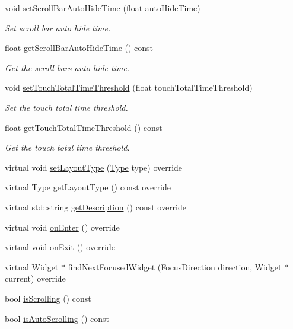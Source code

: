 \begin{DoxyCompactItemize}
void \hyperlink{classui_1_1ScrollView_a388fd5017d29f1686e207348ad040358}{set\+Scroll\+Bar\+Auto\+Hide\+Time} (float auto\+Hide\+Time)
\begin{DoxyCompactList}\small\item\em Set scroll bar auto hide time. \end{DoxyCompactList}\item 
float \hyperlink{classui_1_1ScrollView_a827ccba8ebbcacfe3f8b985b49c606e5}{get\+Scroll\+Bar\+Auto\+Hide\+Time} () const
\begin{DoxyCompactList}\small\item\em Get the scroll bar\textquotesingle{}s auto hide time. \end{DoxyCompactList}\item 
void \hyperlink{classui_1_1ScrollView_a3edbf2bec7e58e40cbde16437d8ee927}{set\+Touch\+Total\+Time\+Threshold} (float touch\+Total\+Time\+Threshold)
\begin{DoxyCompactList}\small\item\em Set the touch total time threshold. \end{DoxyCompactList}\item 
float \hyperlink{classui_1_1ScrollView_ab4d03d2ed9f34c127f7080c900a880d0}{get\+Touch\+Total\+Time\+Threshold} () const
\begin{DoxyCompactList}\small\item\em Get the touch total time threshold. \end{DoxyCompactList}\item 
virtual void \hyperlink{classui_1_1ScrollView_a4056a0a2c5653b6e00fa983740f621d9}{set\+Layout\+Type} (\hyperlink{classui_1_1Layout_aecabbc1592677eadd6757edc1df5b952}{Type} type) override
\item 
virtual \hyperlink{classui_1_1Layout_aecabbc1592677eadd6757edc1df5b952}{Type} \hyperlink{classui_1_1ScrollView_a580fc58c93a299b55fc3c25ab96d22cf}{get\+Layout\+Type} () const override
\item 
virtual std\+::string \hyperlink{classui_1_1ScrollView_ac13041fae03618740ee778f8c3c6db7e}{get\+Description} () const override
\item 
virtual void \hyperlink{classui_1_1ScrollView_afeb85b1cf1e420b57a66c97c08763138}{on\+Enter} () override
\item 
virtual void \hyperlink{classui_1_1ScrollView_a9c9bf9f6d171a618d57c369e53d91a25}{on\+Exit} () override
\item 
virtual \hyperlink{classui_1_1Widget}{Widget} $\ast$ \hyperlink{classui_1_1ScrollView_adda46d15b5742af6e64a96b23c3ca10a}{find\+Next\+Focused\+Widget} (\hyperlink{classui_1_1Widget_a8ae8e8fc793a04a87584205cd1e8a8a5}{Focus\+Direction} direction, \hyperlink{classui_1_1Widget}{Widget} $\ast$current) override
\item 
bool \hyperlink{classui_1_1ScrollView_a86c495325ca9ad778672d6819724bf83}{is\+Scrolling} () const
\item 
bool \hyperlink{classui_1_1ScrollView_a24c6d5d48597092d65e0e25edf4f07e0}{is\+Auto\+Scrolling} () const
\end{DoxyCompactItemize}
